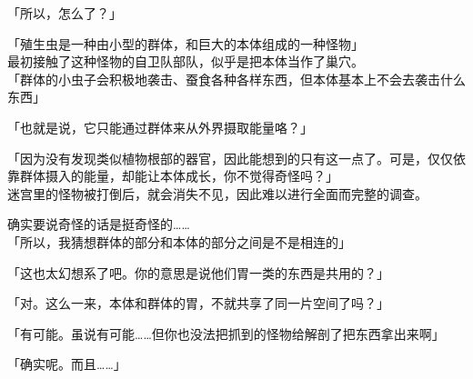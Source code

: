 「所以，怎么了？」

「殖生虫是一种由小型的群体，和巨大的本体组成的一种怪物」\\

最初接触了这种怪物的自卫队部队，似乎是把本体当作了巢穴。\\

「群体的小虫子会积极地袭击、蚕食各种各样东西，但本体基本上不会去袭击什么东西」

「也就是说，它只能通过群体来从外界摄取能量咯？」

「因为没有发现类似植物根部的器官，因此能想到的只有这一点了。可是，仅仅依靠群体摄入的能量，却能让本体成长，你不觉得奇怪吗？」\\

迷宫里的怪物被打倒后，就会消失不见，因此难以进行全面而完整的调查。

确实要说奇怪的话是挺奇怪的……\\

「所以，我猜想群体的部分和本体的部分之间是不是相连的」

「这也太幻想系了吧。你的意思是说他们胃一类的东西是共用的？」

「对。这么一来，本体和群体的胃，不就共享了同一片空间了吗？」

「有可能。虽说有可能……但你也没法把抓到的怪物给解剖了把东西拿出来啊」

「确实呢。而且……」\\

